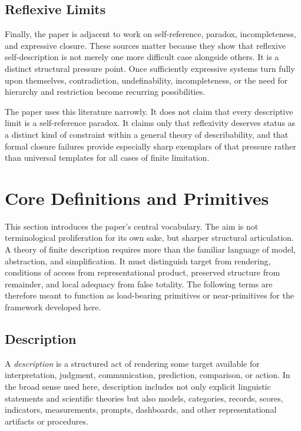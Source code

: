 \documentclass[11pt]{article}
\renewcommand{\emph}[1]{\textit{#1}}
\begin{document}
\subsection{Reflexive Limits}

Finally, the paper is adjacent to work on self-reference, paradox, incompleteness, and expressive closure. These sources matter because they show that reflexive self-description is not merely one more difficult case alongside others. It is a distinct structural pressure point. Once sufficiently expressive systems turn fully upon themselves, contradiction, undefinability, incompleteness, or the need for hierarchy and restriction become recurring possibilities. \cite{bolander_self_reference_sep}

The paper uses this literature narrowly. It does not claim that every descriptive limit is a self-reference paradox. It claims only that reflexivity deserves status as a distinct kind of constraint within a general theory of describability, and that formal closure failures provide especially sharp exemplars of that pressure rather than universal templates for all cases of finite limitation.
\section{Core Definitions and Primitives}

This section introduces the paper's central vocabulary. The aim is not terminological proliferation for its own sake, but sharper structural articulation. A theory of finite description requires more than the familiar language of model, abstraction, and simplification. It must distinguish target from rendering, conditions of access from representational product, preserved structure from remainder, and local adequacy from false totality. The following terms are therefore meant to function as load-bearing primitives or near-primitives for the framework developed here.

\subsection{Description}

A \emph{description} is a structured act of rendering some target available for interpretation, judgment, communication, prediction, comparison, or action. In the broad sense used here, description includes not only explicit linguistic statements and scientific theories but also models, categories, records, scores, indicators, measurements, prompts, dashboards, and other representational artifacts or procedures. \cite{frigg_hartmann_models_sep,frigg_nguyen_scientific_representation_sep}
\end{document}
